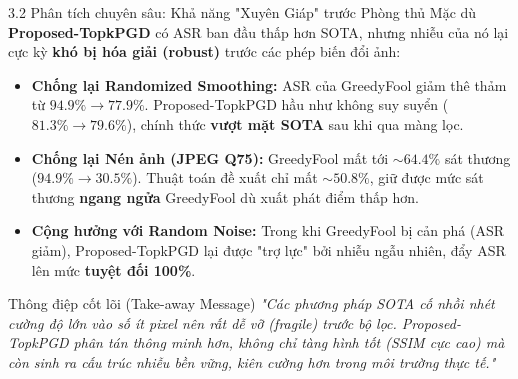 \documentclass[10pt, xcolor=table]{beamer}
\begin{document}
\begin{frame}{3.2 Phân tích chuyên sâu: Khả năng "Xuyên Giáp" trước Phòng thủ}
    Mặc dù \textbf{Proposed-TopkPGD} có ASR ban đầu thấp hơn SOTA, nhưng nhiễu của nó lại cực kỳ \textbf{khó bị hóa giải (robust)} trước các phép biến đổi ảnh:
    \vspace{0.2cm}
    \begin{itemize}
        \item \textbf{Chống lại Randomized Smoothing:} ASR của GreedyFool giảm thê thảm từ $94.9\% \rightarrow 77.9\%$. Proposed-TopkPGD hầu như không suy suyển ($81.3\% \rightarrow 79.6\%$), chính thức \textbf{vượt mặt SOTA} sau khi qua màng lọc.
        \item \textbf{Chống lại Nén ảnh (JPEG Q75):} GreedyFool mất tới $\sim 64.4\%$ sát thương ($94.9\% \rightarrow 30.5\%$). Thuật toán đề xuất chỉ mất $\sim 50.8\%$, giữ được mức sát thương \textbf{ngang ngửa} GreedyFool dù xuất phát điểm thấp hơn.
        \item \textbf{Cộng hưởng với Random Noise:} Trong khi GreedyFool bị cản phá (ASR giảm), Proposed-TopkPGD lại được "trợ lực" bởi nhiễu ngẫu nhiên, đẩy ASR lên mức \textbf{tuyệt đối 100\%}.
    \end{itemize}
    \begin{block}{Thông điệp cốt lõi (Take-away Message)}
        \textit{"Các phương pháp SOTA cố nhồi nhét cường độ lớn vào số ít pixel nên rất dễ vỡ (fragile) trước bộ lọc. Proposed-TopkPGD phân tán thông minh hơn, không chỉ tàng hình tốt (SSIM cực cao) mà còn sinh ra cấu trúc nhiễu bền vững, kiên cường hơn trong môi trường thực tế."}
    \end{block}
\end{frame}
\end{document}
